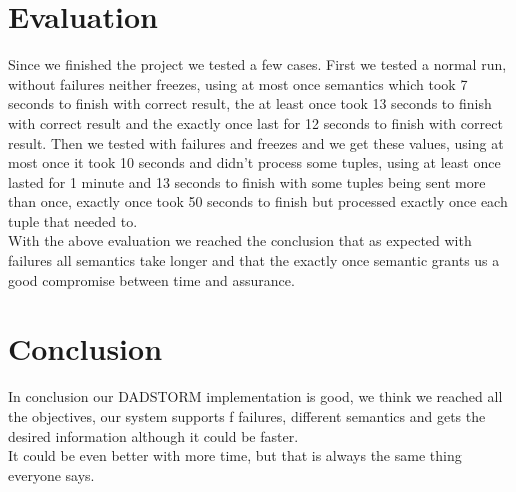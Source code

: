 \documentclass[times, 10pt, twocolumn]{article}
\begin{document}
\section{Evaluation}
Since we finished the project we tested a few cases. First we tested a normal run, without failures neither freezes, using at most once semantics which took 7 seconds to finish with correct result, the at least once took 13 seconds to finish with correct result and the exactly once last for 12 seconds to finish with correct result. Then we tested with failures and freezes and we get these values, using at most once it took 10 seconds and didn't process some tuples, using at least once lasted for 1 minute and 13 seconds to finish with some tuples being sent more than once, exactly once took 50 seconds to finish but processed exactly once each tuple that needed to.
\\With the above evaluation we reached the conclusion that as expected with failures all semantics take longer and that the exactly once semantic grants us a good compromise between time and assurance.





\section{Conclusion}
In conclusion our DADSTORM implementation is good, we think we reached all the objectives, our system supports f failures, different semantics and gets the desired information although it could be faster.
\\It could be even better with more time, but that is always the same thing everyone says.
\end{document}
